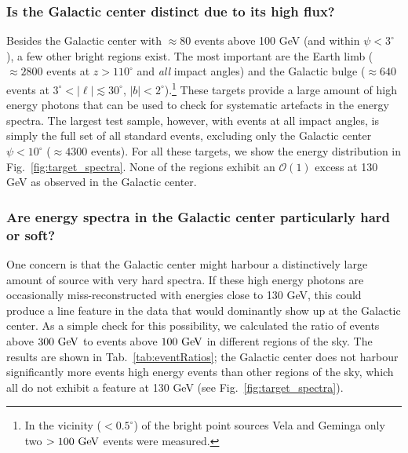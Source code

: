 \documentclass[aps,twocolumn,prd,superscriptaddress,showpacs,nofootinbib,fixfloat]{revtex4}
\newcommand{\GeV}{{\rm ~GeV}}
\begin{document}

\subsubsection{Is the Galactic center distinct due to its high flux?} 
Besides the Galactic center with $\approx80$ events above 100 GeV (and within
$\psi<3^\circ$), a few other bright regions exist.  The most important are the
Earth limb ($\approx2800$ events at $z>110^\circ$ and \emph{all} impact
angles) and the Galactic bulge ($\approx640$ events at
$3^\circ<|\ell|\lesssim30^\circ$, $|b|<2^\circ$).\footnote{In the vicinity
($<0.5^\circ$) of the bright point sources Vela and Geminga only two
$>100\GeV$ events were measured.} These targets provide a large amount of high
energy photons that can be used to check for systematic artefacts in the
energy spectra. The largest test sample, however, with events at all impact
angles, is simply the full set of all standard events, excluding only the
Galactic center $\psi<10^\circ$ ($\approx 4300$ events). For all these
targets, we show the energy distribution in Fig.~\ref{fig:target_spectra}.
None of the regions exhibit an $\mathcal{O}(1)$ excess at 130 GeV as observed
in the Galactic center.

\subsubsection{Are energy spectra in the Galactic center particularly hard or
soft?}

One concern is that the Galactic center might harbour a distinctively large
amount of source with very hard spectra. If these high energy photons are
occasionally miss-reconstructed with energies close to 130 GeV, this could
produce a line feature in the data that would dominantly show up at the
Galactic center. As a simple check for this possibility, we calculated the
ratio of events above $300\GeV$ to events above $100\GeV$ in different regions
of the sky. The results are shown in Tab.~\ref{tab:eventRatios}; the Galactic
center does not harbour significantly more events high energy events than
other regions of the sky, which all do not exhibit a feature at 130 GeV (see
Fig.~\ref{fig:target_spectra}). 
\end{document}
